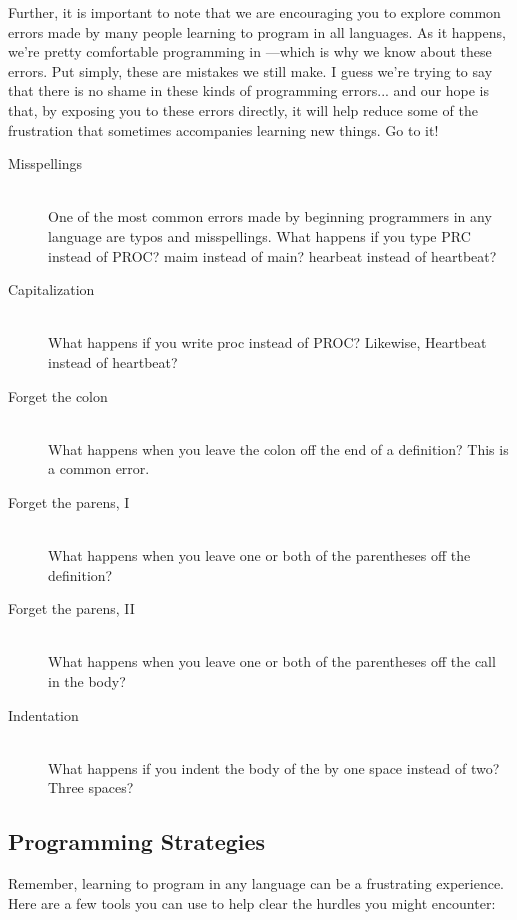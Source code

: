 Further, it is important to note that we are encouraging you to explore common errors made by many people learning to program in all languages. As it happens, we're pretty comfortable programming in \occam---which is why we know about these errors. Put simply, {\strong these are mistakes we still make}. I guess we're trying to say that there is no shame in these kinds of programming errors... and our hope is that, by exposing you to these errors directly, it will help reduce some of the frustration that sometimes accompanies learning new things. Go to it!

\newpage

\begin{description}
  \item[Misspellings]\ \\ One of the most common errors made by beginning programmers in any language are typos and misspellings. What happens if you type {\code PRC} instead of {\code PROC}? {\code maim} instead of {\code main}? {\code hearbeat} instead of {\code heartbeat}?

	\item[Capitalization]\ \\ What happens if you write {\code proc} instead of {\code PROC}? Likewise, {\code Heartbeat} instead of {\code heartbeat}?

	\item[Forget the colon]\ \\ What happens when you leave the colon off the end of a \PROC definition? This is a  common error.
	
	\item[Forget the parens, I]\ \\ What happens when you leave one or both of the parentheses off the \PROC definition?
	
	\item[Forget the parens, II]\ \\ What happens when you leave one or both of the parentheses off the \PROC call in the body?
	
	\item[Indentation]\ \\ What happens if you indent the body of the \PROC by one space instead of two? Three spaces? 
\end{description}
                
\newpage

\subsection{Programming Strategies}
Remember, learning to program in any language can be a frustrating experience. Here are a few tools you can use to help clear the hurdles you might encounter:


